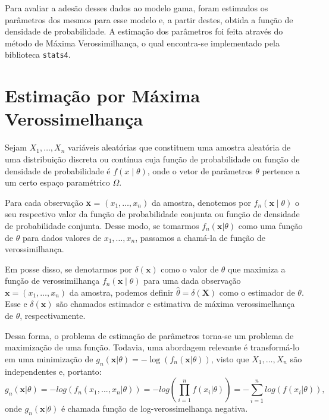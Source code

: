 \documentclass[12pt]{article}
\begin{document}
Para avaliar a adesão desses dados ao modelo gama, foram estimados os parâmetros dos mesmos para esse modelo e, a partir destes, obtida a função de densidade de probabilidade. 
A estimação dos parâmetros foi feita através do método de Máxima Verossimilhança, o qual encontra-se implementado pela biblioteca \texttt{stats4}.

\section{Estimação por Máxima Verossimelhança}

Sejam $X_1, \dots, X_n$ variáveis aleatórias que constituem uma amostra aleatória de uma distribuição discreta ou contínua cuja função de probabilidade ou função de densidade de probabilidade é $f(x\mid \theta)$, onde o vetor de parâmetros $\theta$ pertence a um certo espaço paramétrico $\Omega$. 

Para cada observação \textbf{x} = $(x_1, \dots, x_n)$ da amostra, denotemos por $f_n(\textbf{x}\mid \theta)$ o seu respectivo valor da função de probabilidade conjunta ou função de densidade de probabilidade conjunta. 
Desse modo, se tomarmos $f_n(\textbf{x}|\theta)$ como uma função de $\theta$ para dados valores de $x_1,\dots, x_n$, passamos a chamá-la de função de verossimilhança.

Em posse disso, se denotarmos por $\delta(\textbf{x})$ como o valor de $\theta$ que maximiza a função de verossimilhança $f_n(\textbf{x}\mid\theta)$ para uma dada observação $\textbf{x} = (x_1, \dots, x_n)$ da amostra, podemos definir $\widehat{\theta} = \delta(\textbf{X})$ como o estimador de $\theta$. 
Esse e $\delta(\textbf{x})$ são chamados estimador e estimativa de máxima verossimelhança de $\theta$, respectivamente.

Dessa forma, o problema de estimação de parâmetros torna-se um problema de maximização de uma função. 
Todavia, uma abordagem relevante é transformá-lo em uma minimização de $g_n(\textbf{x}|\theta) = -\log(f_n(\textbf{x}|\theta))$, visto que $X_1,\dots, X_n$ são independentes e, portanto: 
\begin{displaymath}
g_n(\textbf{x}|\theta) = -log( f_n(x_1, ..., x_n|\theta) ) = -log( \prod_{i = 1}^{n} f(x_i|\theta) ) = - \sum_{i = 1}^{n} log( f(x_i|\theta) ),
\end{displaymath}
onde $g_n(\textbf{x}|\theta)$ é chamada função de log-verossimelhança negativa.
\end{document}
